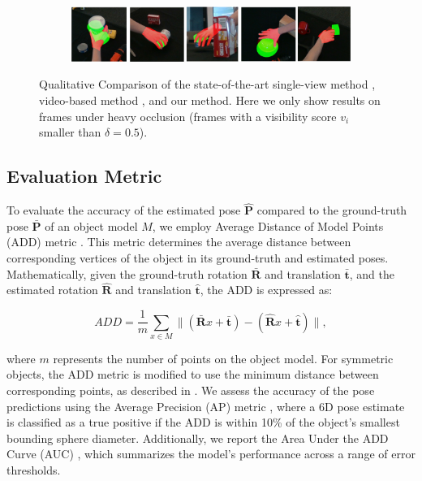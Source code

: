 \begin{figure}[!ht]
\begin{subfigure}{0.98\textwidth}
        \includegraphics[width=\linewidth]{figs/2_3}
        \caption{\cite{castro2023crt}}
    \end{subfigure}
    \caption{Qualitative Comparison of the state-of-the-art single-view method \cite{castro2023crt}, video-based method \cite{wang2023deep},
and our method. Here we only show results on frames under heavy occlusion (frames with a visibility score \( v_i \) smaller than \( \delta = 0.5 \)).}
    \label{fig:result2}
\end{figure}

\subsection{Evaluation Metric}
\label{sec:metric}

To evaluate the accuracy of the estimated pose \(\mathbf{\hat{P}}\) compared to the ground-truth pose \(\mathbf{\bar{P}}\) of an object model \(M\), we employ Average Distance of Model Points (ADD) metric \cite{hinterstoisser2012model}. This metric determines the average distance between corresponding vertices of the object in its ground-truth and estimated poses. Mathematically, given the ground-truth rotation \(\mathbf{\bar{R}}\) and translation \(\mathbf{\bar{t}}\), and the estimated rotation \(\mathbf{\hat{R}}\) and translation \(\mathbf{\hat{t}}\), the ADD is expressed as:

\begin{equation}
ADD = \frac{1}{m} \sum_{x \in M} \parallel (\mathbf{\bar{R}}x + \mathbf{\bar{t}}) - (\mathbf{\hat{R}}x + \mathbf{\hat{t}}) \parallel,
\end{equation}

\noindent where \(m\) represents the number of points on the object model. For symmetric objects, the ADD metric is modified to use the minimum distance between corresponding points, as described in \cite{bregier2017symmetry}. We assess the accuracy of the pose predictions using the Average Precision (AP) metric \cite{bregier2017symmetry}, where a 6D pose estimate is classified as a true positive if the ADD is within 10\% of the object's smallest bounding sphere diameter. Additionally, we report the Area Under the ADD Curve (AUC) \cite{wang2019densefusion}, which summarizes the model's performance across a range of error thresholds.

